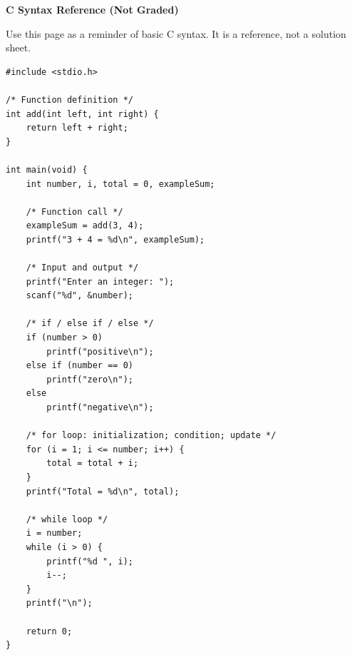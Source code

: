 \documentclass[12pt,a4paper,addpoints]{exam}
\begin{document}
\vfill
\noindent{}

\newpage
\begin{center}\Large\textbf{C Syntax Reference (Not Graded)}\end{center}
\noindent Use this page as a reminder of basic C syntax. It is a reference, not a solution sheet.
\begin{lstlisting}[basicstyle=\ttfamily\footnotesize]
#include <stdio.h>

/* Function definition */
int add(int left, int right) {
    return left + right;
}

int main(void) {
    int number, i, total = 0, exampleSum;

    /* Function call */
    exampleSum = add(3, 4);
    printf("3 + 4 = %d\n", exampleSum);

    /* Input and output */
    printf("Enter an integer: ");
    scanf("%d", &number);

    /* if / else if / else */
    if (number > 0)
        printf("positive\n");
    else if (number == 0)
        printf("zero\n");
    else
        printf("negative\n");

    /* for loop: initialization; condition; update */
    for (i = 1; i <= number; i++) {
        total = total + i;
    }
    printf("Total = %d\n", total);

    /* while loop */
    i = number;
    while (i > 0) {
        printf("%d ", i);
        i--;
    }
    printf("\n");

    return 0;
}
\end{lstlisting}
\end{document}
